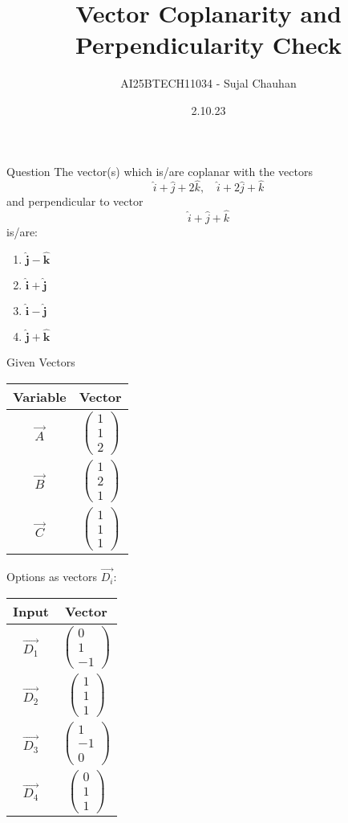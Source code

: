 \documentclass[12pt]{beamer}
\title[Vector Coplanarity Problem]{Vector Coplanarity and Perpendicularity Check}
\author{AI25BTECH11034 - Sujal Chauhan}
\date{2.10.23}
\newcommand{\myvec}[1]{\begin{pmatrix}#1\end{pmatrix}}
\begin{document}
\begin{frame}
    \titlepage
\end{frame}

\begin{frame}{Question}
\small
The vector(s) which is/are coplanar with the vectors 
\[
\hat{i}+\hat{j}+2\hat{k}, \quad \hat{i}+2\hat{j}+\hat{k}
\] 
and perpendicular to vector 
\[
\hat{i}+\hat{j}+\hat{k}
\]
is/are:
\begin{enumerate}[label=\alph*)]
    \item $\hat{\mathbf{j}} - \hat{\mathbf{k}}$
    \item $\hat{\mathbf{i}} + \hat{\mathbf{j}}$
    \item $\hat{\mathbf{i}} - \hat{\mathbf{j}}$
    \item $\hat{\mathbf{j}} + \hat{\mathbf{k}}$
\end{enumerate}
\end{frame}

\begin{frame}{Given Vectors}
\small
\begin{center}
\begin{tabular}{|c|c|}
\hline
Variable & Vector \\
\hline
$\vec{A}$ & $\myvec{1 \\ 1 \\ 2}$ \\
\hline
$\vec{B}$ & $\myvec{1 \\ 2 \\ 1}$ \\
\hline
$\vec{C}$ & $\myvec{1 \\ 1 \\ 1}$ \\
\hline
\end{tabular}
\end{center}

\vspace{0.3cm}
\end{frame}
\begin{frame}
Options as vectors $\vec{D_i}$:
\begin{center}
\begin{tabular}{|c|c|}
\hline
Input & Vector \\
\hline
$\vec{D_1}$ & $\myvec{0 \\ 1 \\ -1}$ \\
\hline
$\vec{D_2}$ & $\myvec{1 \\ 1 \\ 1}$ \\
\hline
$\vec{D_3}$ & $\myvec{1 \\ -1 \\ 0}$ \\
\hline
$\vec{D_4}$ & $\myvec{0 \\ 1 \\ 1}$ \\
\hline
\end{tabular}
\end{center}
\end{frame}
\end{document}
